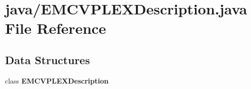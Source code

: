 \section{java/\-E\-M\-C\-V\-P\-L\-E\-X\-Description.java File Reference}
\label{EMCVPLEXDescription_8java}
\subsection*{Data Structures}
\begin{DoxyCompactItemize}
\item 
class {\bf E\-M\-C\-V\-P\-L\-E\-X\-Description}
\end{DoxyCompactItemize}

